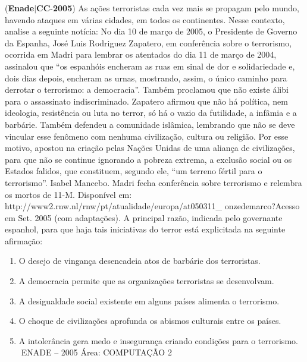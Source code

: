 \documentclass{exam}
\begin{document}
\begin{questions}
\question (\textbf{Enade}$|$\textbf{CC}-\textbf{2005}) As ações terroristas cada vez mais se propagam pelo mundo,
havendo ataques em várias cidades, em todos os continentes.
Nesse contexto, analise a seguinte notícia:
No dia 10 de março de 2005, o Presidente de Governo da
Espanha, José Luis Rodriguez Zapatero, em conferência sobre o
terrorismo, ocorrida em Madri para lembrar os atentados do dia
11 de março de 2004, assinalou que “os espanhóis encheram as
ruas em sinal de dor e solidariedade e, dois dias depois, encheram
as urnas, mostrando, assim, o único caminho para derrotar o
terrorismo: a democracia”. Também proclamou que não existe
álibi para o assassinato indiscriminado. Zapatero afirmou que não
há política, nem ideologia, resistência ou luta no terror, só há o
vazio da futilidade, a infâmia e a barbárie. Também defendeu a
comunidade islâmica, lembrando que não se deve vincular esse
fenômeno com nenhuma civilização, cultura ou religião. Por esse
motivo, apostou na criação pelas Nações Unidas de uma aliança de
civilizações, para que não se continue ignorando a pobreza
extrema, a exclusão social ou os Estados falidos, que constituem,
segundo ele, “um terreno fértil para o terrorismo”.
Isabel Mancebo. Madri fecha conferência sobre terrorismo e
relembra os mortos de 11-M. Disponível em:
http://www2.rnw.nl/rnw/pt/atualidade/europa/at050311\_
onzedemarco?Acesso em Set. 2005 (com adaptações).
A principal razão, indicada pelo governante espanhol, para que
haja tais iniciativas do terror está explicitada na seguinte
afirmação:
	\begin{enumerate}[label=\alph*)]
		\item  O desejo de vingança desencadeia atos de barbárie dos
terroristas.
		\item  A democracia permite que as organizações terroristas se
desenvolvam.
		\item  A desigualdade social existente em alguns países alimenta o
terrorismo.
		\item  O choque de civilizações aprofunda os abismos culturais
entre os países.
		\item  A intolerância gera medo e insegurança criando condições
para o terrorismo.
ENADE – 2005 Área: COMPUTAÇÃO 2

	\end{enumerate}


\end{questions}
\end{document}
